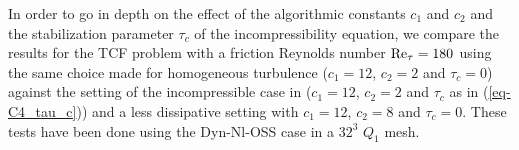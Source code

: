In order to go in depth on the effect of the algorithmic constants $c_1$ and $c_2$ and the stabilization parameter $\tau_c$ of the incompressibility equation, we compare the results for the TCF problem with a friction Reynolds number ${\rm Re}_\tau=180$ using the same choice made for homogeneous turbulence 
($c_1=12$, $c_2=2$ and $\tau_c=0$) against the setting of the incompressible case in \cite{Avila2014} ($c_1=12$, $c_2=2$ and $\tau_c$ as in (\ref{eq-C4_tau_c})) and a less dissipative setting with $c_1=12$, $c_2=8$ and $\tau_c=0$. These tests have been done using the Dyn-Nl-OSS case in a $32^3$ $Q_1$ mesh.
\begin{figure}[h!]
	\centering	
  	\\    

\end{figure}

